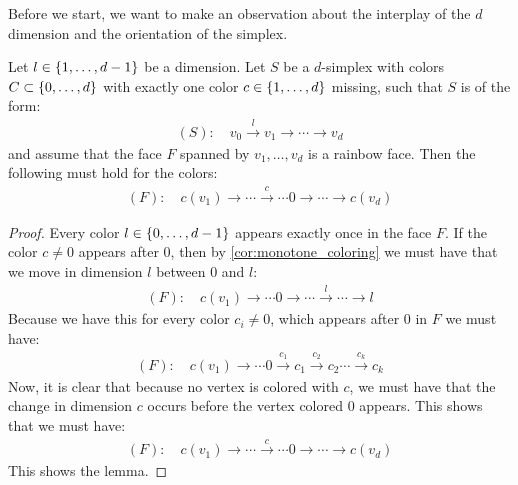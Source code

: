 Before we start, we want to make an observation about the interplay of the $d$ dimension and the orientation of the simplex.
\begin{lemma}\label{lem:position_of_d_in_simplex}
	Let $l \in \left\{1, \dots, d-1\right\}$ be a dimension. Let $S$ be a $d$-simplex with colors $C \subset \left\{0, \dots, d\right\}$ with exactly one color $c \in \left\{1, \dots, d\right\}$ missing, such that $S$ is of the form:
	\begin{align*}
		(S): \quad v_0 \xrightarrow{l} v_1 \xrightarrow{} \cdots \xrightarrow{} v_d
	\end{align*}
	and assume that the face $F$ spanned by $v_1, \dots, v_d$ is a rainbow face. Then the following must hold for the colors:
	\begin{align*}
		(F): \quad c(v_1) \xrightarrow{}  \cdots \xrightarrow{c} \cdots  0 \xrightarrow{} \cdots \xrightarrow{} c(v_d)
	\end{align*}
\end{lemma}
\begin{proof}
	Every color $l \in \left\{0, \dots, d-1\right\}$ appears exactly once in the face $F$. If the color $c \neq 0$ appears after $0$, then by \cref{cor:monotone_coloring} we must have that we move in dimension $l$ between $0$ and $l$:
	\begin{align*}
		(F): \quad c(v_1) \xrightarrow{} \cdots  0 \xrightarrow{} \cdots \xrightarrow{l} \cdots \xrightarrow{} l
	\end{align*}
	Because we have this for every color $c_i \neq 0$, which appears after $0$ in $F$ we must have:
	\begin{align*}
		(F): \quad c(v_1) \xrightarrow{} \cdots  0 \xrightarrow{c_1} c_1 \xrightarrow{c_2} c_2 \cdots \xrightarrow{c_k} c_k
	\end{align*}
	Now, it is clear that because no vertex is colored with $c$, we must have that the change in dimension $c$ occurs before the vertex colored $0$ appears. This shows that we must have:
	\begin{align*}
		(F): \quad c(v_1) \xrightarrow{}  \cdots \xrightarrow{c} \cdots  0 \xrightarrow{} \cdots \xrightarrow{} c(v_d)
	\end{align*}
	This shows the lemma.
\end{proof}

